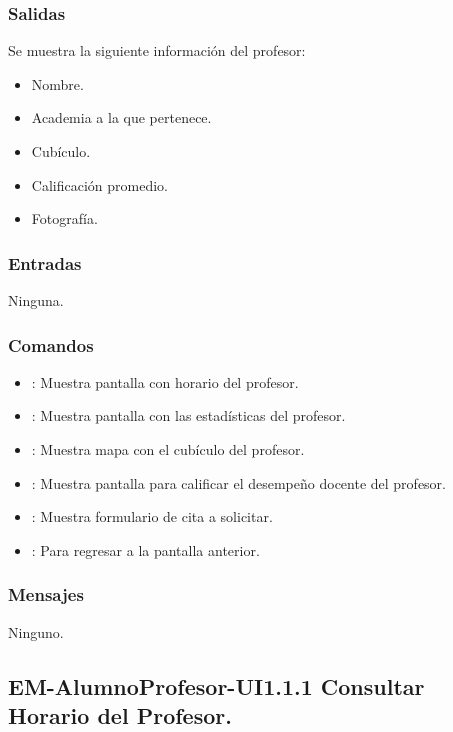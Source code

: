 \subsubsection{Salidas}
	\noindent
	Se muestra la siguiente información del profesor:
	\begin{itemize}
		\item Nombre.
		\item Academia a la que pertenece.
		\item Cubículo.
		\item Calificación promedio.
		\item Fotografía. 
	\end{itemize}

\subsubsection{Entradas}
	\noindent
	Ninguna.

\subsubsection{Comandos}
\begin{itemize}
	\item {}: Muestra pantalla con horario del profesor.
	\item {}: Muestra pantalla con las estadísticas del profesor.
	\item {}: Muestra mapa con el cubículo del profesor.
	\item {}: Muestra pantalla para calificar el desempeño docente del profesor.
	\item {}: Muestra formulario de cita a solicitar.
	\item {}: Para regresar a la pantalla anterior.
\end{itemize}

\subsubsection{Mensajes}
	\noindent
	Ninguno.


\pagebreak
\subsection{EM-AlumnoProfesor-UI1.1.1 Consultar Horario del Profesor.}

